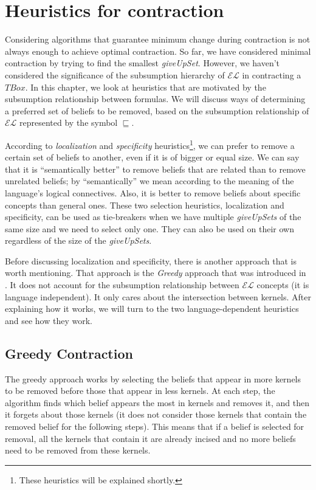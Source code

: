 \chapter{Heuristics for contraction}
Considering algorithms that guarantee minimum change during contraction is not always enough to achieve optimal contraction. So far, we have considered minimal contraction by trying to find the smallest \textit{giveUpSet}. However, we haven't considered the significance of the subsumption hierarchy of $\mathcal{EL}$ in contracting a $TBox$. In this chapter, we look at heuristics that are motivated by the subsumption relationship between formulas. We will discuss ways of determining a preferred set of beliefs to be removed, based on the subsumption relationship of $\mathcal{EL}$ represented by the symbol $\sqsubseteq$. 

According to \textit{localization} and \textit{specificity} heuristics\footnote{These heuristics will be explained shortly.}, we can prefer to remove a certain set of beliefs to another, even if it is of bigger or equal size. We can say that it is ``semantically better'' to remove beliefs that are related than to remove unrelated beliefs; by ``semantically'' we mean according to the meaning of the language's logical connectives. Also, it is better to remove beliefs about specific concepts than general ones. These two selection heuristics, localization and specificity, can be used as tie-breakers when we have multiple \textit{giveUpSets} of the same size and we need to select only one. They can also be used on their own regardless of the size of the \textit{giveUpSets}.

Before discussing localization and specificity, there is another approach that is worth mentioning. That approach is the \textit{Greedy} approach that was introduced in \cite{zwei}. It does not account for the subsumption relationship between $\mathcal{EL}$ concepts (it is language independent). It only cares about the intersection between kernels. After explaining how it works, we will turn to the two language-dependent heuristics and see how they work.


\section{Greedy Contraction}
The greedy approach works by selecting the beliefs that appear in more kernels to be removed before those that appear in less kernels. At each step, the algorithm finds which belief appears the most in kernels and removes it, and then it forgets about those kernels (it does not consider those kernels that contain the removed belief for the following steps). This means that if a belief is selected for removal, all the kernels that contain it are already incised and no more beliefs need to be removed from these kernels.

